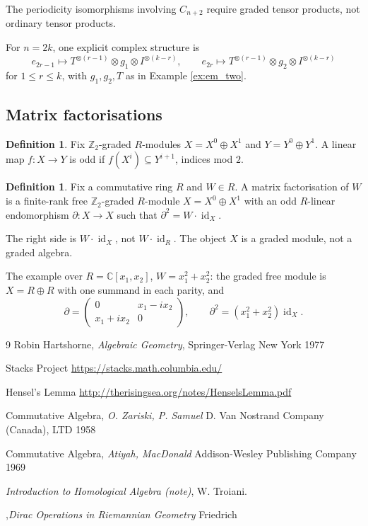 \documentclass[12pt]{article}
\theoremstyle{plain}
\theoremstyle{definition}
\newtheorem{defn}[thm]{Definition} %
\begin{document}
The periodicity isomorphisms involving $C_{n+2}$ require graded tensor products, not ordinary tensor products.

For $n=2k$, one explicit complex structure is
\[
e_{2r-1}\mapsto T^{\otimes(r-1)}\otimes g_1\otimes I^{\otimes(k-r)},\qquad e_{2r}\mapsto T^{\otimes(r-1)}\otimes g_2\otimes I^{\otimes(k-r)}
\]
for $1\le r\le k$, with $g_1,g_2,T$ as in Example \ref{ex:em_two}.

\subsection{Matrix factorisations}

\begin{defn}
Fix $\mathbb{Z}_2$-graded $R$-modules $X=X^0\oplus X^1$ and $Y=Y^0\oplus Y^1$. A linear map $f:X\to Y$ is odd if $f(X^i)\subseteq Y^{i+1}$, indices mod $2$.
\end{defn}

\begin{defn}
Fix a commutative ring $R$ and $W\in R$. A matrix factorisation of $W$ is a finite-rank free $\mathbb{Z}_2$-graded $R$-module $X=X^0\oplus X^1$ with an odd $R$-linear endomorphism $\partial:X\to X$ such that $\partial^2=W\cdot\operatorname{id}_X$.
\end{defn}

The right side is $W\cdot\operatorname{id}_X$, not $W\cdot\operatorname{id}_R$. The object $X$ is a graded module, not a graded algebra.

The example over $R=\mathbb{C}[x_1,x_2]$, $W=x_1^2+x_2^2$: the graded free module is $X=R\oplus R$ with one summand in each parity, and
\[
\partial=\begin{pmatrix}0&x_1-ix_2\\x_1+ix_2&0\end{pmatrix},\qquad \partial^2=(x_1^2+x_2^2)\operatorname{id}_X.
\]

\begin{thebibliography}{9}
 Robin Hartshorne, \emph{Algebraic Geometry}, Springer-Verlag New York 1977

 Stacks Project \url{https://stacks.math.columbia.edu/}

 Hensel's Lemma \url{http://therisingsea.org/notes/HenselsLemma.pdf}

 Commutative Algebra, \emph{O. Zariski, P. Samuel} D. Van Nostrand Company (Canada), LTD 1958

 Commutative Algebra, \emph{Atiyah, MacDonald} Addison-Wesley Publishing Company 1969

 \emph{Introduction to Homological Algebra (note)}, W. Troiani.

,\emph{Dirac Operations in Riemannian Geometry} Friedrich

\end{thebibliography}
\end{document}

